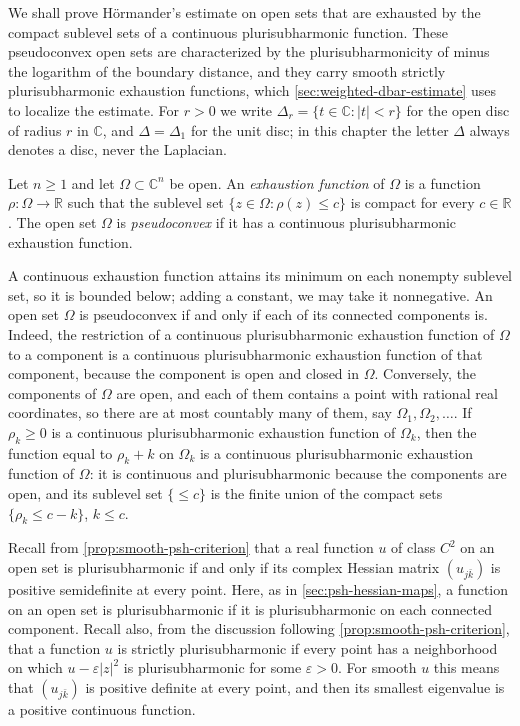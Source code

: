 We shall prove H\"ormander's estimate on open sets that are exhausted by the compact sublevel sets of a continuous plurisubharmonic function. These pseudoconvex open sets are characterized by the plurisubharmonicity of minus the logarithm of the boundary distance, and they carry smooth strictly plurisubharmonic exhaustion functions, which \cref{sec:weighted-dbar-estimate} uses to localize the estimate. For $r>0$ we write $\Delta_r=\{t\in\mathbb C:|t|<r\}$ for the open disc of radius $r$ in $\mathbb C$, and $\Delta=\Delta_1$ for the unit disc; in this chapter the letter $\Delta$ always denotes a disc, never the Laplacian.

\begin{definition}\label{def:pseudoconvex-domain}
Let $n\ge1$ and let $\Omega\subset\mathbb C^n$ be open. An \emph{exhaustion function} of $\Omega$ is a function $\rho\colon\Omega\to\mathbb R$ such that the sublevel set $\{z\in\Omega:\rho(z)\le c\}$ is compact for every $c\in\mathbb R$. The open set $\Omega$ is \emph{pseudoconvex} if it has a continuous plurisubharmonic exhaustion function.
\end{definition}

A continuous exhaustion function attains its minimum on each nonempty sublevel set, so it is bounded below; adding a constant, we may take it nonnegative. An open set $\Omega$ is pseudoconvex if and only if each of its connected components is. Indeed, the restriction of a continuous plurisubharmonic exhaustion function of $\Omega$ to a component is a continuous plurisubharmonic exhaustion function of that component, because the component is open and closed in $\Omega$. Conversely, the components of $\Omega$ are open, and each of them contains a point with rational real coordinates, so there are at most countably many of them, say $\Omega_1,\Omega_2,\ldots$. If $\rho_k\ge0$ is a continuous plurisubharmonic exhaustion function of $\Omega_k$, then the function equal to $\rho_k+k$ on $\Omega_k$ is a continuous plurisubharmonic exhaustion function of $\Omega$: it is continuous and plurisubharmonic because the components are open, and its sublevel set $\{\le c\}$ is the finite union of the compact sets $\{\rho_k\le c-k\}$, $k\le c$.

Recall from \cref{prop:smooth-psh-criterion} that a real function $u$ of class $C^2$ on an open set is plurisubharmonic if and only if its complex Hessian matrix $(u_{j\bar k})$ is positive semidefinite at every point. Here, as in \cref{sec:psh-hessian-maps}, a function on an open set is plurisubharmonic if it is plurisubharmonic on each connected component. Recall also, from the discussion following \cref{prop:smooth-psh-criterion}, that a function $u$ is strictly plurisubharmonic if every point has a neighborhood on which $u-\varepsilon|z|^2$ is plurisubharmonic for some $\varepsilon>0$. For smooth $u$ this means that $(u_{j\bar k})$ is positive definite at every point, and then its smallest eigenvalue is a positive continuous function.

